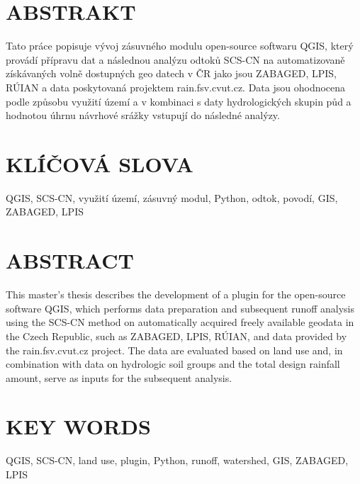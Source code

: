 \documentclass[a4paper,oneside,12pt]{book}
\begin{document}
\newbox\odstavecbox
\newlength\vyskaodstavce
\newcommand\odstavec[2]{%
    \setbox\odstavecbox=\hbox{%
         \parbox[t]{#1}{#2\vrule width 0pt depth 4pt}}%
    \global\vyskaodstavce=\dp\odstavecbox
    \box\odstavecbox}
\newcommand{\delka}{120mm} %


\section*{ABSTRAKT}
\begin{flushleft}
Tato práce popisuje vývoj zásuvného modulu open-source softwaru QGIS, který provádí přípravu dat a následnou analýzu odtoků SCS-CN  na automatizovaně získávaných volně dostupných geo datech v ČR jako jsou ZABAGED, LPIS, RÚIAN a data poskytovaná projektem rain.fsv.cvut.cz. Data jsou ohodnocena podle způsobu využití území a v kombinaci s daty hydrologických skupin půd a hodnotou úhrnu návrhové srážky vstupují do následné analýzy.
\end{flushleft}


\section*{KLÍČOVÁ SLOVA}
\begin{flushleft}
QGIS, SCS-CN, využití území, zásuvný modul, Python, odtok, povodí, GIS, ZABAGED, LPIS
\end{flushleft}


\section*{ABSTRACT}
\begin{flushleft}
This master's thesis describes the development of a plugin for the open-source software QGIS, which performs data preparation and subsequent runoff analysis using the SCS-CN method on automatically acquired freely available geodata in the Czech Republic, such as ZABAGED, LPIS, RÚIAN, and data provided by the rain.fsv.cvut.cz project. The data are evaluated based on land use and, in combination with data on hydrologic soil groups and the total design rainfall amount, serve as inputs for the subsequent analysis.
\end{flushleft}


\section*{KEY WORDS}
\begin{flushleft}
QGIS, SCS-CN, land use, plugin, Python, runoff, watershed, GIS, ZABAGED, LPIS
\end{flushleft}
\end{document}
